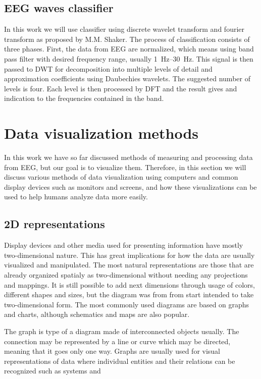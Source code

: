 \subsection{EEG waves classifier}
In this work we will use classifier using discrete wavelet transform and fourier
transform as proposed by M.M. Shaker. \cite{eegWaveFt} The process of
classification consists of three phases. First, the data from EEG are
normalized, which means using band pass filter with desired frequency range,
usually \SIrange{1}{30}{\Hz}. This signal is then passed to DWT for
decomposition into multiple levels of detail and approximation
coefficients using Daubechies wavelets. The suggested number of levels is four.
Each level is then processed by DFT and the result gives and indication to the
frequencies contained in the band.

\section{Data visualization methods}
In this work we have so far discussed methods of measuring and processing data
from EEG, but our goal is to visualize them. Therefore, in this section we will
discuss various methods of data visualization using computers and common display
devices such as monitors and screens, and how these visualizations can be used
to help humans analyze data more easily.

\subsection{2D representations}
Display devices and other media used for presenting information have
mostly two-dimensional nature. This has great implications for how the data are
usually visualized and manipulated. The most natural representations are those
that are already organized spatialy as two-dimensional without needing any
projections and mappings. It is still possible to add next dimensions through
usage of colors, different shapes and sizes, but the diagram was from from start
intended to take two-dimensional form. The most commonly used diagrams are based
on graphs and charts, although schematics and maps are also popular.

The graph is type of a diagram made of interconnected objects usually. The
connection may be represented by a line or curve which may be directed, meaning
that it goes only one way. Graphs are usually used for visual representations
of data where individual entities and their relations can be recognized such as
systems and %

